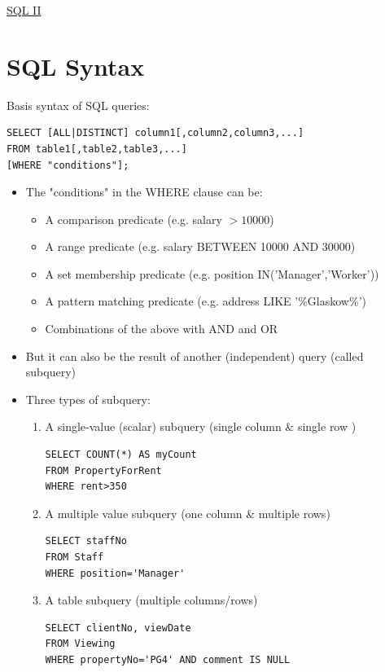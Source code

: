 \documentclass{article}[18pt]
\begin{document}
\begin{center}
\underline{\huge SQL II}
\end{center}
\section{SQL Syntax}
Basis syntax of SQL queries:
\begin{verbatim}
SELECT [ALL|DISTINCT] column1[,column2,column3,...]
FROM table1[,table2,table3,...]
[WHERE "conditions"];
\end{verbatim}
\begin{itemize}
	\item The "conditions" in the WHERE clause can be:
	\begin{itemize}
		\item A comparison predicate (e.g. salary $>10000$)
		\item A range predicate (e.g. salary BETWEEN 10000 AND 30000)
		\item A set membership predicate (e.g. position IN('Manager','Worker'))
		\item A pattern matching predicate (e.g. address LIKE '\%Glaskow\%')
		\item Combinations of the above with AND and OR
	\end{itemize}
	\item But it can also be the result of another (independent) query (called subquery)
	\item Three types of subquery:
	\begin{enumerate}
		\item A single-value (scalar) subquery (single column \& single row )
		\begin{verbatim}
SELECT COUNT(*) AS myCount
FROM PropertyForRent
WHERE rent>350
		\end{verbatim}
		\item A multiple value subquery (one column \& multiple rows)
		\begin{verbatim}
SELECT staffNo
FROM Staff
WHERE position='Manager'
		\end{verbatim}
		\item A table subquery (multiple columns/rows)
		\begin{verbatim}
SELECT clientNo, viewDate
FROM Viewing
WHERE propertyNo='PG4' AND comment IS NULL
		\end{verbatim}
	\end{enumerate}
\end{itemize}
\end{document}
